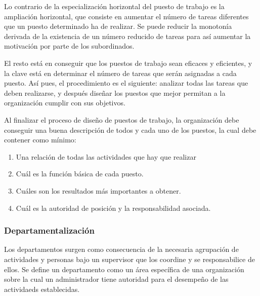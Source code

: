 \documentclass[12pt,a4paper,spanish]{report}
\begin{document}
				Lo contrario de la especialización horizontal del puesto de trabajo es la ampliación horizontal, que consiste en aumentar el número de tareas diferentes que un puesto determinado ha de realizar. Se puede reducir la monotonía derivada de la existencia de un número reducido de tareas para así aumentar la motivación por parte de los subordinados.

				El resto está en conseguir que los puestos de trabajo sean eficaces y eficientes, y la clave está en determinar el número de tareas que serán asignadas a cada puesto. Así pues, el procedimiento es el siguiente: analizar todas las tareas que deben realizarse, y después diseñar los puestos que mejor permitan a la organización cumplir con sus objetivos.

				Al finalizar el proceso de diseño de puestos de trabajo, la organización debe conseguir una buena descripción de todos y cada uno de los puestos, la cual debe contener como mínimo:
				\begin{enumerate}
					\item Una relación de todas las actividades que hay que realizar
					\item Cuál es la función básica de cada puesto.
					\item Cuáles son los resultados más importantes a obtener.
					\item Cuál es la autoridad de posición y la responsabilidad asociada.
				\end{enumerate}

			\subsubsection{\textcolor[rgb]{0.5,0.1,0.4}Departamentalización}
				Los departamentos surgen como consecuencia de la necesaria agrupación de actividades y personas bajo un supervisor que los coordine y se responsabilice de ellos. Se define un departamento como un área específica de una organización sobre la cual un administrador tiene autoridad para el desempeño de las actividaeds establecidas.
\end{document}
